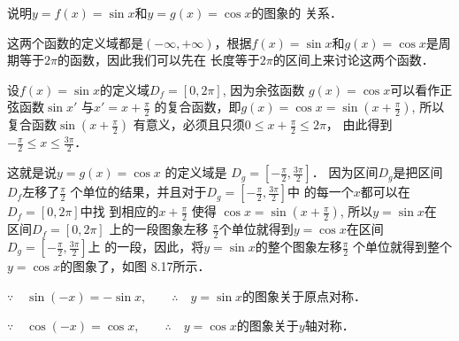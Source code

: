 \begin{example}
    说明$y=f(x)=\sin x$和$y=g(x)=\cos x$的图象的
关系．
\end{example}


\begin{solution}
 这两个函数的定义域都是$(-\infty,+\infty)$，根据$f(x)=
\sin x$和$g(x)=\cos x$是周期等于$2\pi$的函数，因此我们可以先在
长度等于$2\pi$的区间上来讨论这两个函数．

设$f(x)=\sin x$的定义域$D_f=[0,2\pi]$, 因为余弦函数
$g(x)=\cos x$可以看作正弦函数$\sin x'$ 与$x'=x+\frac{\pi}{2}$
的复合函数，即$g(x)=\cos x=\sin\left(x+\frac{\pi}{2}\right)$,
所以复合函数$\sin\left(x+\frac{\pi}{2} \right)$
有意义，必须且只须$0\le x+\frac{\pi}{2}\le 2\pi$，
由此得到$-\frac{\pi}{2}\le x\le \frac{3\pi}{2}$．

这就是说$y=g(x)=\cos x$ 的定义域是
$D_g=\left[-\frac{\pi}{2},\frac{3\pi}{2}\right]$．
因为区间$D_g$是把区间$D_f$左移了$\frac{\pi}{2}$
个单位的结果，并且对于$D_g=\left[-\frac{\pi}{2},\frac{3\pi}{2}\right]$中
的每一个$x$都可以在$D_f=[0,2\pi ]$中找
到相应的$x+\frac{\pi}{2}$
使得
$\cos x=\sin\left(x+\frac{\pi}{2}\right)$,
所以$y=\sin x$在
区间$D_f=[0,2\pi]$ 上的一段图象左移
$\frac{\pi}{2}$个单位就得到$y=\cos x$在区间$D_g=
\left[-\frac{\pi}{2},\frac{3\pi}{2}\right]$上
的一段，因此，将$y=\sin x$的整个图象左移$\frac{\pi}{2}$
个单位就得到整个$y=\cos x$的图象了，如图
8.17所示．
\begin{figure}[htp]
    \centering
{}    
    \caption{}
\end{figure}

$\because\quad \sin(-x)=-\sin x,\qquad \therefore\quad y=\sin x$的图象关于原点对称．

$\because\quad \cos(-x)=\cos x,\qquad \therefore\quad y=\cos x$的图象关于$y$轴对称．

\end{solution}

